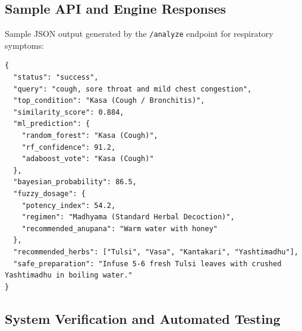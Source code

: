 \documentclass[12pt,a4paper]{article}
\begin{document}
\subsection{Sample API and Engine Responses}

Sample JSON output generated by the \texttt{/analyze} endpoint for respiratory symptoms:

\begin{verbatim}
{
  "status": "success",
  "query": "cough, sore throat and mild chest congestion",
  "top_condition": "Kasa (Cough / Bronchitis)",
  "similarity_score": 0.884,
  "ml_prediction": {
    "random_forest": "Kasa (Cough)",
    "rf_confidence": 91.2,
    "adaboost_vote": "Kasa (Cough)"
  },
  "bayesian_probability": 86.5,
  "fuzzy_dosage": {
    "potency_index": 54.2,
    "regimen": "Madhyama (Standard Herbal Decoction)",
    "recommended_anupana": "Warm water with honey"
  },
  "recommended_herbs": ["Tulsi", "Vasa", "Kantakari", "Yashtimadhu"],
  "safe_preparation": "Infuse 5-6 fresh Tulsi leaves with crushed Yashtimadhu in boiling water."
}
\end{verbatim}

\subsection{System Verification and Automated Testing}
\end{document}
